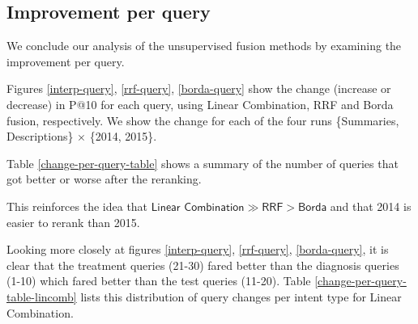 \subsection{Improvement per query}
We conclude our analysis of the unsupervised fusion methods by examining the improvement per query.

Figures \ref{interp-query}, \ref{rrf-query}, \ref{borda-query} show the change (increase or decrease) in P@10 for each query,
using Linear Combination, RRF and Borda fusion, respectively. 
We show the change for each of the four runs \{Summaries, Descriptions\} $\times$ \{2014, 2015\}.

Table \ref{change-per-query-table} shows a summary of the number of queries that got better or worse after the reranking.

\begin{table}[h!]
\centering
\caption{Number of better/worse queries.}
\label{change-per-query-table}
\end{table}

This reinforces the idea that $\textsf{Linear Combination} \gg \textsf{RRF} > \textsf{Borda}$
and that 2014 is easier to rerank than 2015.

Looking more closely at figures \ref{interp-query}, \ref{rrf-query}, \ref{borda-query}, it is clear that
the treatment queries (21-30) fared better than the diagnosis queries (1-10) which fared better than the test queries (11-20).
Table \ref{change-per-query-table-lincomb} lists this distribution of query changes per intent
type for Linear Combination.

